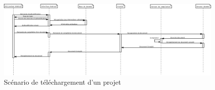 \documentclass[a4paper,12pt]{article}
\begin{document}
\paragraph{}
\begin{figure}[!ht]
\begin{center}
  \includegraphics[width=1\textwidth, angle=90]{./Diagramme/Android/telechargementRenduProjet.jpg}
\end{center}
  \caption{Scénario de téléchargement d'un projet}
  \label{androidDownloadProject}
\end{figure}

\newpage
\listoffigures
\end{document}
